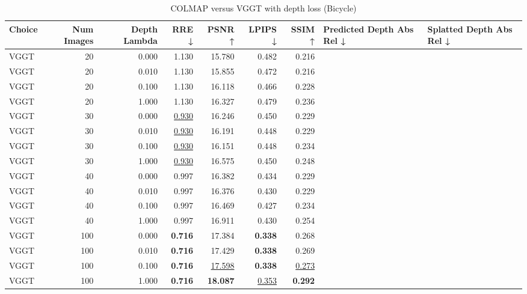 \begin{table}[H]
\caption{COLMAP versus VGGT with depth loss (Bicycle)}
\label{tab:05_depth_lambda_num_images_bicycle}
\small
\begin{tabular}{lrrrrrrll}
\toprule
Choice & Num Images & Depth Lambda & RRE ↓ & PSNR ↑ & LPIPS ↓ & SSIM ↑ & Predicted Depth Abs Rel ↓ & Splatted Depth Abs Rel ↓ \\
\midrule
VGGT & 20 & 0.000 & 1.130 & 15.780 & 0.482 & 0.216 &  &  \\
VGGT & 20 & 0.010 & 1.130 & 15.855 & 0.472 & 0.216 &  &  \\
VGGT & 20 & 0.100 & 1.130 & 16.118 & 0.466 & 0.228 &  &  \\
VGGT & 20 & 1.000 & 1.130 & 16.327 & 0.479 & 0.236 &  &  \\
VGGT & 30 & 0.000 & \underline{0.930} & 16.246 & 0.450 & 0.229 &  &  \\
VGGT & 30 & 0.010 & \underline{0.930} & 16.191 & 0.448 & 0.229 &  &  \\
VGGT & 30 & 0.100 & \underline{0.930} & 16.151 & 0.448 & 0.234 &  &  \\
VGGT & 30 & 1.000 & \underline{0.930} & 16.575 & 0.450 & 0.248 &  &  \\
VGGT & 40 & 0.000 & 0.997 & 16.382 & 0.434 & 0.229 &  &  \\
VGGT & 40 & 0.010 & 0.997 & 16.376 & 0.430 & 0.229 &  &  \\
VGGT & 40 & 0.100 & 0.997 & 16.469 & 0.427 & 0.234 &  &  \\
VGGT & 40 & 1.000 & 0.997 & 16.911 & 0.430 & 0.254 &  &  \\
VGGT & 100 & 0.000 & \textbf{0.716} & 17.384 & \textbf{0.338} & 0.268 &  &  \\
VGGT & 100 & 0.010 & \textbf{0.716} & 17.429 & \textbf{0.338} & 0.269 &  &  \\
VGGT & 100 & 0.100 & \textbf{0.716} & \underline{17.598} & \textbf{0.338} & \underline{0.273} &  &  \\
VGGT & 100 & 1.000 & \textbf{0.716} & \textbf{18.087} & \underline{0.353} & \textbf{0.292} &  &  \\
\bottomrule
\end{tabular}
\end{table}